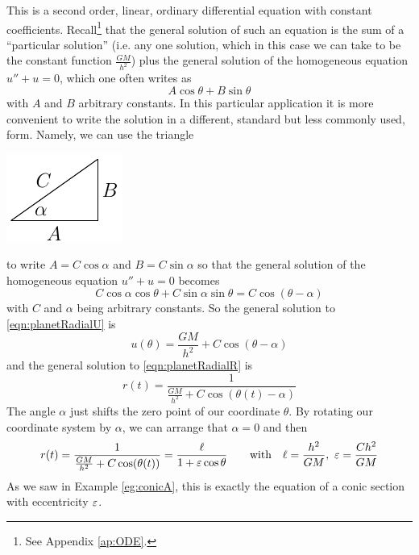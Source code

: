This is a second order, linear, ordinary differential equation
with constant coefficients.  Recall\footnote{See Appendix \ref{ap:ODE}.} 
that the general solution of such an 
equation is the sum of a ``particular solution'' (i.e. any one solution,
which in this case we can take to be the constant function $\frac{GM}{h^2}$)
plus the general solution of the homogeneous equation
$u''+u=0$, which one often writes as
\begin{equation*}
A\cos\theta +B\sin\theta
\end{equation*}
with $A$ and $B$  arbitrary constants. In this particular application it is 
more convenient to write the solution in a different, standard but less
commonly used, form. Namely, we can use the triangle
\begin{efig}
\begin{center}
     \includegraphics{trianglePl.pdf}
\end{center}
\end{efig}
to write $A= C\cos\alpha$ and $B=C\sin\alpha$ so that 
the general solution of the homogeneous equation $u''+u=0$ becomes
\begin{equation*}
C\cos\alpha\cos\theta +C\sin\alpha\sin\theta
=C\cos(\theta-\alpha)
\end{equation*}
with $C$ and $\alpha$ being arbitrary constants. So the general solution 
to \eqref{eqn:planetRadialU} is
\begin{equation*}
u(\theta) = \frac{GM}{h^2} + C\cos(\theta-\alpha)
\end{equation*}
and the general solution to \eqref{eqn:planetRadialR} is
\begin{equation*}
r(t) = \frac{1}{\frac{GM}{h^2} + C\cos(\theta(t)-\alpha)}
\end{equation*}
The angle $\alpha$ just shifts the zero point of our coordinate $\theta$.
By rotating our coordinate system by $\alpha$, we can arrange that $\alpha=0$
and then
\begin{equation*}
r(t) = \frac{1}{\frac{GM}{h^2} + C\cos(\theta(t))}
     = \frac{\ell}{1+\veps\cos\theta}
\qquad\text{with}\quad
\ell=\frac{h^2}{GM},\ 
\veps=\frac{Ch^2}{GM}
\end{equation*}
As we saw in Example \ref{eg:conicA}, this is exactly the equation 
of a conic section with eccentricity $\varepsilon$.

